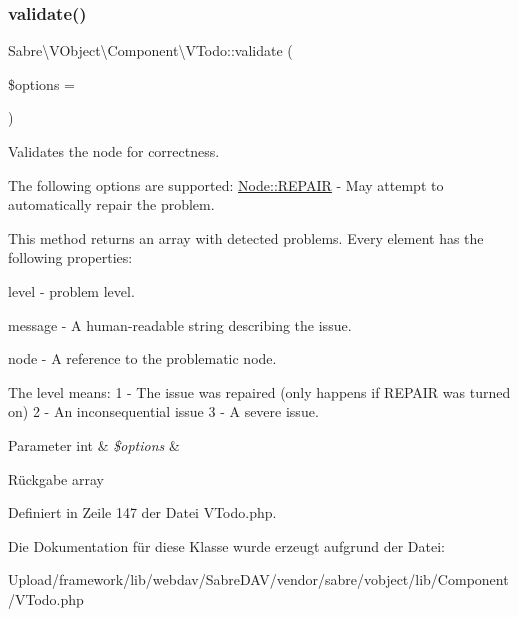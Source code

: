 \subsubsection{\texorpdfstring{validate()}{validate()}}
{\footnotesize\ttfamily Sabre\textbackslash{}\+V\+Object\textbackslash{}\+Component\textbackslash{}\+V\+Todo\+::validate (\begin{DoxyParamCaption}\item[{}]{\$options = {} }\end{DoxyParamCaption})}

Validates the node for correctness.

The following options are supported\+: \mbox{\hyperlink{class_sabre_1_1_v_object_1_1_node_ac97a7fb85c1f871523336cd1ec6b29a9}{Node\+::\+R\+E\+P\+A\+IR}} -\/ May attempt to automatically repair the problem.

This method returns an array with detected problems. Every element has the following properties\+:


\begin{DoxyItemize}
\item level -\/ problem level.
\item message -\/ A human-\/readable string describing the issue.
\item node -\/ A reference to the problematic node.
\end{DoxyItemize}

The level means\+: 1 -\/ The issue was repaired (only happens if R\+E\+P\+A\+IR was turned on) 2 -\/ An inconsequential issue 3 -\/ A severe issue.


\begin{DoxyParams}[1]{Parameter}
int & {\em \$options} & \\
\hline
\end{DoxyParams}
\begin{DoxyReturn}{Rückgabe}
array 
\end{DoxyReturn}


Definiert in Zeile 147 der Datei V\+Todo.\+php.



Die Dokumentation für diese Klasse wurde erzeugt aufgrund der Datei\+:\begin{DoxyCompactItemize}
\item 
Upload/framework/lib/webdav/\+Sabre\+D\+A\+V/vendor/sabre/vobject/lib/\+Component/V\+Todo.\+php\end{DoxyCompactItemize}
